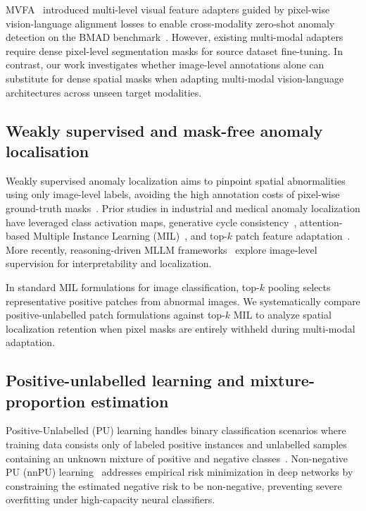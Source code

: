 \documentclass[10pt,twocolumn,letterpaper]{article}
\begin{document}
MVFA~\cite{huang2024mvfa} introduced multi-level visual feature adapters guided by pixel-wise vision-language alignment losses to enable cross-modality zero-shot anomaly detection on the BMAD benchmark~\cite{bmad2024}. However, existing multi-modal adapters require dense pixel-level segmentation masks for source dataset fine-tuning. In contrast, our work investigates whether image-level annotations alone can substitute for dense spatial masks when adapting multi-modal vision-language architectures across unseen target modalities.

\subsection{Weakly supervised and mask-free anomaly localisation}
Weakly supervised anomaly localization aims to pinpoint spatial abnormalities using only image-level labels, avoiding the high annotation costs of pixel-wise ground-truth masks~\cite{mvtec2019, cycle_seg2021}. Prior studies in industrial and medical anomaly localization have leveraged class activation maps, generative cycle consistency~\cite{cycle_seg2021}, attention-based Multiple Instance Learning (MIL)~\cite{ilse2018attentionmil}, and top-$k$ patch feature adaptation~\cite{adfa2023}. More recently, reasoning-driven MLLM frameworks~\cite{imagelevel2026} explore image-level supervision for interpretability and localization.

In standard MIL formulations for image classification, top-$k$ pooling selects representative positive patches from abnormal images. We systematically compare positive-unlabelled patch formulations against top-$k$ MIL to analyze spatial localization retention when pixel masks are entirely withheld during multi-modal adaptation.

\subsection{Positive-unlabelled learning and mixture-proportion estimation}
Positive-Unlabelled (PU) learning handles binary classification scenarios where training data consists only of labeled positive instances and unlabelled samples containing an unknown mixture of positive and negative classes~\cite{elkan2008pu}. Non-negative PU (nnPU) learning~\cite{kiryo2017nnpu} addresses empirical risk minimization in deep networks by constraining the estimated negative risk to be non-negative, preventing severe overfitting under high-capacity neural classifiers.
\end{document}
